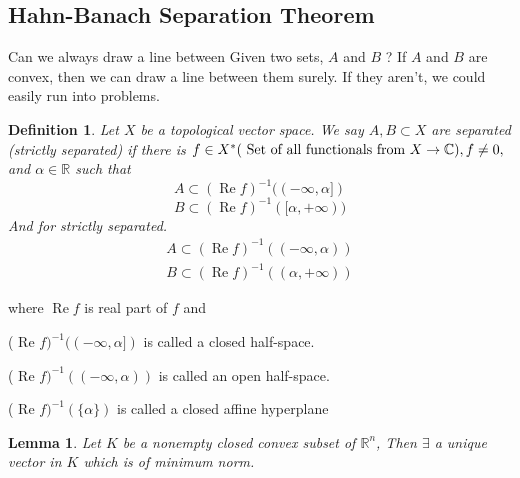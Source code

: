 \documentclass[oneside]{book}
\newtheorem{lemma}[theorem]{Lemma}
\newtheorem{mydef}{Definition}[section]
\begin{document}
	
	
	\subsection{Hahn-Banach Separation Theorem}
	\label{ss:11}
	Can we always draw a line between Given two sets, $ A$ and $ B$ ?
	If $ A$ and $ B$ are convex, then we can draw a line between them surely. If they aren't, we could easily run into problems.
	
	
	
	
	
	
	
	
	
	\begin{mydef} 
		Let $X$ be a topological vector space. We say $A, B \subset X$ are separated (strictly separated) if there is $f \in X^{*}(\text{ Set of all functionals from } \\
		X \rightarrow \mathbb{C}) 
		, f \neq 0,$ and $\alpha \in \mathbb{R}$ such that
		\[
		A \subset(\operatorname{Re} f)^{-1}((-\infty, \alpha])
		\]
		\[
		B \subset(\operatorname{Re} f)^{-1}([\alpha,+\infty))
		\]
		And for strictly separated.
		\[
		\begin{array}{l}
		A \subset(\operatorname{Re} f)^{-1}((-\infty, \alpha)) \\
		B \subset(\operatorname{Re} f)^{-1}((\alpha,+\infty))
		\end{array}
		\]
	\end{mydef}
	
	where $\operatorname{Re} f$ is real part of $f$ and
	\hfill \ \break
	
	\quad \quad \quad \quad \quad 
	( Re $f)^{-1}((-\infty, \alpha])$ is called a closed half-space.
	\newline
	
	\quad \quad \quad \quad \quad ( Re $f)^{-1}((-\infty, \alpha))$ is called an open half-space.
	\newline
	
	\quad \quad \quad \quad \quad ( Re $f)^{-1}(\{\alpha\})$ is called a closed affine hyperplane \\
	
	
	
	
	
	
	
	\begin{lemma}
		\label{l:1}
		Let $K$ be a nonempty closed convex subset of $\mathbb{R}^{n}$, Then $\exists $ a  unique vector in $K$ which is of minimum norm.
	\end{lemma}
	
\end{document}

